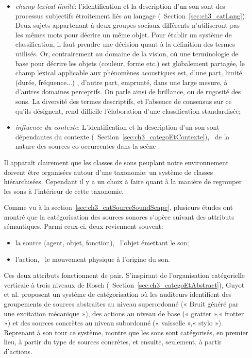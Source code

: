 \begin{itemize}
\begin{itemize}
\item \emph{champ lexical limité}: l'identification et la description d'un son sont des processus subjectifs étroitement liés au langage (\cf~Section~\ref{sec:ch3_catLang}). Deux sujets appartenant à deux groupes sociaux différents n'utiliseront pas les mêmes mots pour décrire un même objet. Pour établir un système de classification, il faut prendre une décision quant à la définition des termes utilisés. Or, contrairement au domaine de la vision, où une terminologie de base pour décrire les objets (couleur, forme etc.) est globalement partagée, le champ lexical applicable aux phénomènes acoustiques est, d'une part, limité (durée, fréquence...) \citep{dubois2000categories}, d'autre part, emprunté, dans une large mesure, à d'autres domaines perceptifs. On parle ainsi de brillance, ou de rugosité des sons. La diversité des termes descriptifs, et l'absence de consensus sur ce qu'ils désignent, rend difficile l'élaboration d'une classification standardisée;
\item \emph{influence du contexte}: L'identification et la description d'un son sont dépendantes du contexte (\cf~Section~\ref{sec:ch3_categoEtContexte}), \ie~de la nature des sources co-occurrentes dans la scène \citep{ballas1987interpreting,niessen2008disambiguating,gygi2011incongruency}.
\end{itemize}
\end{itemize}

Il apparaît clairement que les classes de sons peuplant notre environnement doivent être organisées autour d'une taxonomie: un système de classes hiérarchisées. Cependant il y a un choix à faire quant à la manière de regrouper les sons à l'intérieur de cette taxonomie.

Comme vu à la section~\ref{sec:ch3_catSourceSoundScape}, plusieurs études ont montré que la catégorisation des sources sonores s'opère suivant des attributs sémantiques. Parmi ceux-ci, deux reviennent souvent:

\begin{itemize}
\item la source (agent, objet, fonction), \ie~l'objet émettant le son;
\item l'action, \ie~le mouvement physique à l'origine du son.
\end{itemize} 

Ces deux attributs fonctionnent de pair. S'inspirant de l'organisation catégorielle verticale à trois niveaux de Rosch (\cf~Section~\ref{sec:ch3_categoEtAbstract}), Guyot et al. \citep{guyot1997} proposent un système de catégorisation où les auditeurs identifient des groupements de sources abstraites au niveau superordonné (« Bruit généré par une excitation mécanique »), des actions au niveau de base (« gratter »,« frotter ») et des sources concrètes au niveau subordonné (« vaisselle »,« stylo »). Reprenant à son tour ce système, \citep{houix_lexical_2012} montre que les sons sont catégorisés, en premier lieu, à partir du type de sources concrètes, et ensuite, seulement, à partir d'actions.

